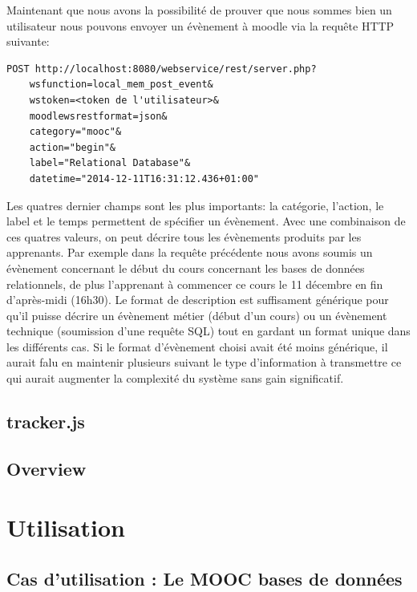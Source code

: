 \documentclass[a4paper,11pt]{report}
\begin{document}
Maintenant que nous avons la possibilité de prouver que nous sommes bien un utilisateur nous pouvons envoyer un évènement à moodle via la requête HTTP suivante:

\begin{lstlisting}[caption={3. Soumet un évènement}]
POST http://localhost:8080/webservice/rest/server.php?
    wsfunction=local_mem_post_event&
    wstoken=<token de l'utilisateur>&
    moodlewsrestformat=json&
    category="mooc"&
    action="begin"&
    label="Relational Database"&
    datetime="2014-12-11T16:31:12.436+01:00"
\end{lstlisting}

Les quatres dernier champs sont les plus importants: la catégorie, l'action, le label et le temps permettent de spécifier un évènement. Avec une combinaison de ces quatres valeurs, on peut décrire tous les évènements produits par les apprenants. Par exemple dans la requête précédente nous avons soumis un évènement concernant le début du cours concernant les bases de données relationnels, de plus l'apprenant à commencer ce cours le 11 décembre en fin d'après-midi (16h30).
Le format de description est suffisament générique pour qu'il puisse décrire un évènement métier (début d'un cours) ou un évènement technique (soumission d'une requête SQL) tout en gardant un format unique dans les différents cas. Si le format d'évènement choisi avait été moins générique, il aurait falu en maintenir plusieurs suivant le type d'information à transmettre ce qui aurait augmenter la complexité du système sans gain significatif.

\section{tracker.js}

\section{Overview}

\pagestyle{fancy}

\chapter{Utilisation}

\pagestyle{fancy}

\section{Cas d'utilisation : Le MOOC bases de données}
\end{document}
